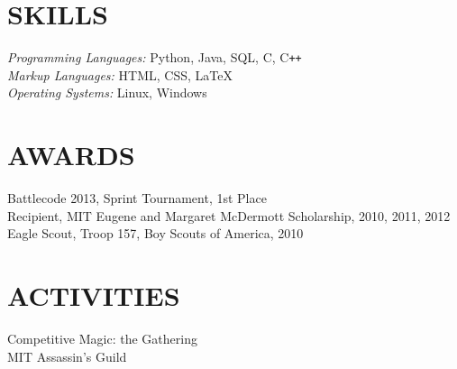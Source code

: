 \documentclass[margin]{res}
\begin{document}
\begin{resume}
\section{SKILLS}    {\sl Programming Languages:} Python, Java, SQL, C,
                      C\texttt{++} \\
                    {\sl Markup Languages:} HTML, CSS, \LaTeX \\
                    {\sl Operating Systems:} Linux, Windows
 
 
\section{AWARDS}    Battlecode 2013, Sprint Tournament, 1st Place\\
                    Recipient, MIT Eugene and Margaret McDermott Scholarship, 
                    2010, 2011, 2012\\
                    Eagle Scout, Troop 157, Boy Scouts of America, 2010

\section{ACTIVITIES}
                    Competitive Magic: the Gathering\\
                    MIT Assassin's Guild

\end{resume}
\end{document}

